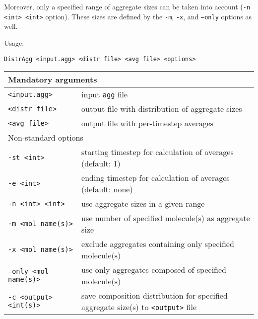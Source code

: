Moreover, only a specified range of aggregate sizes can be taken into
account (\texttt{-n <int> <int>} option). These sizes are defined by the
\texttt{-m}, \texttt{-x}, and \texttt{--only} options as well.

Usage:

\vspace{1em}
\noindent
\texttt{DistrAgg <input.agg> <distr file> <avg file> <options>}

\noindent
\begin{longtable}{p{}p{}}
  \toprule
  \multicolumn{2}{l}{Mandatory arguments} \\
  \midrule
  \texttt{<input.agg>} & input \texttt{agg} file \\
  \texttt{<distr file>} & output file with distribution of aggregate
    sizes \\
  \texttt{<avg file>} & output file with per-timestep averages \\
  \toprule
  \multicolumn{2}{l}{Non-standard options} \\
  \midrule
  \texttt{-st <int>} & starting timestep for calculation of averages (default: 1) \\
  \texttt{-e <int>} & ending timestep for calculation of averages (default: none) \\
  \texttt{-n <int> <int>} & use aggregate sizes in a given range \\
  \texttt{-m <mol name(s)>} & use number of specified molecule(s) as
    aggregate size \\
  \texttt{-x <mol name(s)>} & exclude aggregates containing only specified
    mole\-cule(s) \\
  \texttt{--only <mol name(s)>} & use only aggregates composed of specified
    molecule(s) \\
  \texttt{-c <output> <int(s)>} & save composition distribution for
    specified aggregate size(s) to \texttt{<output>} file \\
  \bottomrule
\end{longtable}

